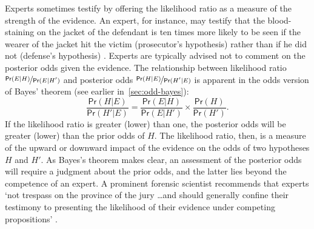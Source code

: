 \documentclass{article}
\newcommand{\pr}{\mathsf{Pr}}
\begin{document}
%
%

Experts sometimes testify by offering the likelihood ratio as a measure of the strength of the evidence.  An expert, for instance, may testify that the blood-staining on the jacket of the defendant is ten times more likely to be seen if the wearer of the jacket hit the victim (prosecutor's hypothesis) rather than if he did not (defense's hypothesis) \citep[p.\ 38]{aitken2010fundamentals}. 
Experts are typically 
advised not to comment 
on the posterior odds given the evidence.
The relationship between likelihood ratio $\nicefrac{\pr(E \vert H)}{\pr(E \vert H')}$ and  posterior odds $\nicefrac{\pr(H \vert E)}{\pr(H' \vert E)}$ is apparent in 
the odds version of Bayes' theorem 
(see earlier in~\ref{sec:odd-bayes}):
%
\[\frac{\pr(H \vert E)}{\pr(H' \vert E)}= \frac{\pr(E \vert H)}{\pr(E \vert H')}\times \frac{\pr(H)}{\pr(H')}.\]
%
If the likelihood ratio is greater (lower) than one, the posterior odds will be greater (lower) than the prior odds of $H$. The likelihood ratio, then, is a measure of the upward or downward impact of the evidence on the odds of two hypotheses $H$ and $H'$.
%
As Bayes's theorem makes clear, an assessment of the posterior odds will require a judgment about the prior odds, and the latter lies beyond the competence of an expert. A prominent forensic scientist recommends that  experts `not trespass on the province of the jury %
\dots and should generally confine their testimony to presenting the likelihood of their evidence under competing propositions' \citep[p.\ 42]{aitken2010fundamentals}. 
\end{document}
